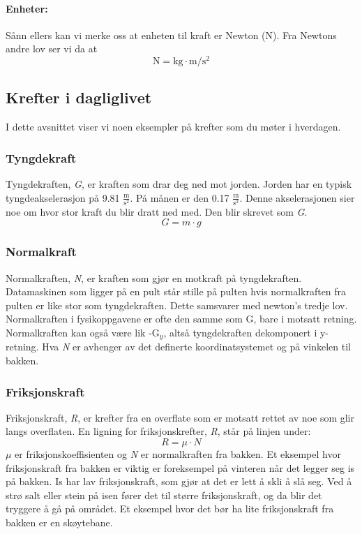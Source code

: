 \paragraph{Enheter:} Sånn ellers kan vi merke oss at enheten til kraft er Newton (N). Fra Newtons andre lov ser vi da at 
\[\textrm{N}=\textrm{kg}\cdot\textrm{m}/\textrm{s}^2\]



\subsection{Krefter i dagliglivet}
I dette avsnittet viser vi noen eksempler på krefter som du møter i hverdagen.

\subsubsection{Tyngdekraft}
Tyngdekraften, \textit{G}, er kraften som drar deg ned mot jorden. Jorden har en typisk tyngdeakselerasjon på 9.81 $\frac{\textrm{m}}{\textrm{s}^2}$. På månen er den 0.17 $\frac{\textrm{m}}{\textrm{s}^2}$. Denne akselerasjonen sier noe om hvor stor kraft du blir dratt ned med. Den blir skrevet som \textit{G}.
\[G=m\cdot g\]

\subsubsection{Normalkraft}
Normalkraften, \textit{N}, er kraften som gjør en motkraft på tyngdekraften. Datamaskinen som ligger på en pult står stille på pulten hvis normalkraften fra pulten er like stor som tyngdekraften. Dette samsvarer med newton's tredje lov. Normalkraften i fysikoppgavene er ofte den samme som G, bare i motsatt retning. Normalkraften kan også være lik -G$_y$, altså tyngdekraften dekomponert i y-retning. Hva \textit{N} er avhenger av det definerte koordinatsystemet og på vinkelen til bakken. 

\subsubsection{Friksjonskraft}
Friksjonskraft, \textit{R}, er krefter fra en overflate som er motsatt rettet av noe som glir langs overflaten. En ligning for friksjonskrefter, \textit{R}, står på linjen under:
\[R=\mu \cdot N\]
$\mu$ er friksjonskoeffisienten og \textit{N} er normalkraften fra bakken.
Et eksempel hvor friksjonskraft fra bakken er viktig er foreksempel på vinteren når det legger seg is på bakken. Is har lav friksjonskraft, som gjør at det er lett å skli å slå seg. Ved å strø salt eller stein på isen fører det til større friksjonskraft, og da blir det tryggere å gå på området. Et eksempel hvor det bør ha lite friksjonskraft fra bakken er en skøytebane. 

